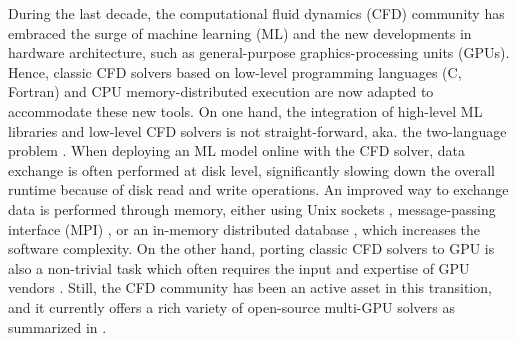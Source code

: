 \documentclass[10pt,a4paper]{article}
\begin{document}
During the last decade, the computational fluid dynamics (CFD) community has embraced the surge of machine learning (ML) and the new developments in hardware architecture, such as general-purpose graphics-processing units (GPUs). Hence, classic CFD solvers based on low-level programming languages (C, Fortran) and CPU memory-distributed execution are now adapted to accommodate these new tools. On one hand, the integration of high-level ML libraries and low-level CFD solvers is not straight-forward, aka. the two-language problem \citep{Churavy2022}. When deploying an ML model online with the CFD solver, data exchange is often performed at disk level, significantly slowing down the overall runtime because of disk read and write operations. An improved way to exchange data is performed through memory, either using Unix sockets \citep{Rabault2019, Font2021}, message-passing interface (MPI) \citep{Guastoni2023}, or an in-memory distributed database \citep{Kurz2022,Font2024}, which increases the software complexity. On the other hand, porting classic CFD solvers to GPU is also a non-trivial task which often requires the input and expertise of GPU vendors \citep{Romero2022}. Still, the CFD community has been an active asset in this transition, and it currently offers a rich variety of open-source multi-GPU solvers as summarized in .
\end{document}
